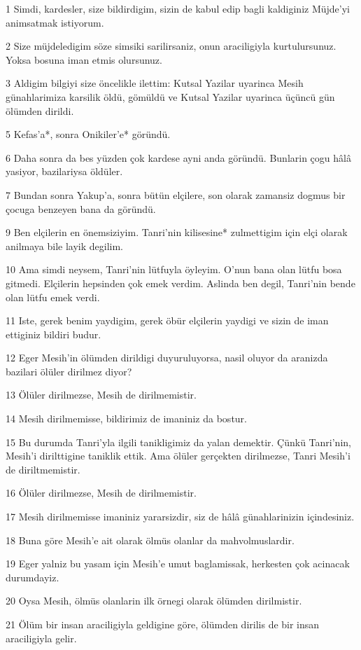 \par 1 Simdi, kardesler, size bildirdigim, sizin de kabul edip bagli kaldiginiz Müjde'yi animsatmak istiyorum.
\par 2 Size müjdeledigim söze simsiki sarilirsaniz, onun araciligiyla kurtulursunuz. Yoksa bosuna iman etmis olursunuz.
\par 3 Aldigim bilgiyi size öncelikle ilettim: Kutsal Yazilar uyarinca Mesih günahlarimiza karsilik öldü, gömüldü ve Kutsal Yazilar uyarinca üçüncü gün ölümden dirildi.
\par 5 Kefas'a*, sonra Onikiler'e* göründü.
\par 6 Daha sonra da bes yüzden çok kardese ayni anda göründü. Bunlarin çogu hâlâ yasiyor, bazilariysa öldüler.
\par 7 Bundan sonra Yakup'a, sonra bütün elçilere, son olarak zamansiz dogmus bir çocuga benzeyen bana da göründü.
\par 9 Ben elçilerin en önemsiziyim. Tanri'nin kilisesine* zulmettigim için elçi olarak anilmaya bile layik degilim.
\par 10 Ama simdi neysem, Tanri'nin lütfuyla öyleyim. O'nun bana olan lütfu bosa gitmedi. Elçilerin hepsinden çok emek verdim. Aslinda ben degil, Tanri'nin bende olan lütfu emek verdi.
\par 11 Iste, gerek benim yaydigim, gerek öbür elçilerin yaydigi ve sizin de iman ettiginiz bildiri budur.
\par 12 Eger Mesih'in ölümden dirildigi duyuruluyorsa, nasil oluyor da aranizda bazilari ölüler dirilmez diyor?
\par 13 Ölüler dirilmezse, Mesih de dirilmemistir.
\par 14 Mesih dirilmemisse, bildirimiz de imaniniz da bostur.
\par 15 Bu durumda Tanri'yla ilgili tanikligimiz da yalan demektir. Çünkü Tanri'nin, Mesih'i dirilttigine taniklik ettik. Ama ölüler gerçekten dirilmezse, Tanri Mesih'i de diriltmemistir.
\par 16 Ölüler dirilmezse, Mesih de dirilmemistir.
\par 17 Mesih dirilmemisse imaniniz yararsizdir, siz de hâlâ günahlarinizin içindesiniz.
\par 18 Buna göre Mesih'e ait olarak ölmüs olanlar da mahvolmuslardir.
\par 19 Eger yalniz bu yasam için Mesih'e umut baglamissak, herkesten çok acinacak durumdayiz.
\par 20 Oysa Mesih, ölmüs olanlarin ilk örnegi olarak ölümden dirilmistir.
\par 21 Ölüm bir insan araciligiyla geldigine göre, ölümden dirilis de bir insan araciligiyla gelir.
